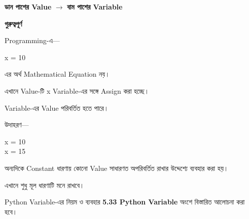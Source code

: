 \begin{center}

\textbf{ডান পাশের Value}
\(\longrightarrow\)
\textbf{বাম পাশের Variable}

\end{center}

\begin{rememberbox}

\textbf{\color{deepOrange}গুরুত্বপূর্ণ}

Programming-এ—

\begin{center}

\textenglish{\ttfamily x = 10}

\end{center}

এর অর্থ Mathematical Equation নয়।

এখানে
\textenglish{}
Value-টি
\textenglish{\ttfamily x}
Variable-এর সঙ্গে Assign করা হচ্ছে।

\end{rememberbox}



Variable-এর Value পরিবর্তিত হতে পারে।

উদাহরণ—

\begin{codebox}

\begin{english}
\ttfamily
x = 10\\
x = 15
\end{english}

\end{codebox}

অন্যদিকে Constant ধারণায় কোনো Value সাধারণত
অপরিবর্তিত রাখার উদ্দেশ্যে ব্যবহার করা হয়।

\begin{rememberbox}

এখানে শুধু মূল ধারণাটি মনে রাখবে।

Python Variable-এর নিয়ম ও ব্যবহার
\textbf{5.33 Python Variable}
অংশে বিস্তারিত আলোচনা করা হবে।

\end{rememberbox}



